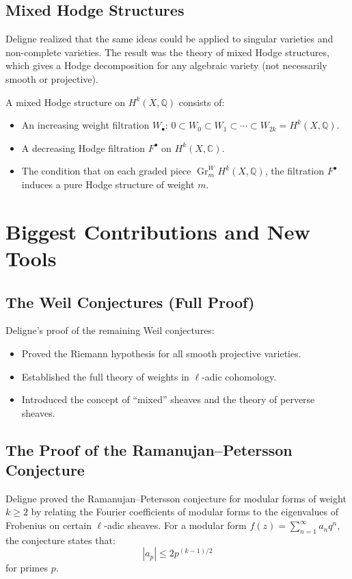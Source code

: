 \subsection{Mixed Hodge Structures}

Deligne realized that the same ideas could be applied to singular varieties and non-complete varieties. The result was the theory of mixed Hodge structures, which gives a Hodge decomposition for any algebraic variety (not necessarily smooth or projective).

A mixed Hodge structure on $H^k(X, \mathbb{Q})$ consists of:
\begin{itemize}
\item An increasing weight filtration $W_\bullet$: $0 \subset W_0 \subset W_1 \subset \cdots \subset W_{2k} = H^k(X, \mathbb{Q})$.
\item A decreasing Hodge filtration $F^\bullet$ on $H^k(X, \mathbb{C})$.
\item The condition that on each graded piece $\operatorname{Gr}^W_m H^k(X, \mathbb{Q})$, the filtration $F^\bullet$ induces a pure Hodge structure of weight $m$.
\end{itemize}

\section{Biggest Contributions and New Tools}

\subsection{The Weil Conjectures (Full Proof)}

Deligne's proof of the remaining Weil conjectures:
\begin{itemize}
\item Proved the Riemann hypothesis for all smooth projective varieties.
\item Established the full theory of weights in $\ell$-adic cohomology.
\item Introduced the concept of ``mixed'' sheaves and the theory of perverse sheaves.
\end{itemize}

\subsection{The Proof of the Ramanujan--Petersson Conjecture}

Deligne proved the Ramanujan--Petersson conjecture for modular forms of weight $k \geq 2$ by relating the Fourier coefficients of modular forms to the eigenvalues of Frobenius on certain $\ell$-adic sheaves. For a modular form $f(z) = \sum_{n=1}^\infty a_n q^n$, the conjecture states that:
\[
|a_p| \leq 2 p^{(k-1)/2}
\]
for primes $p$.

